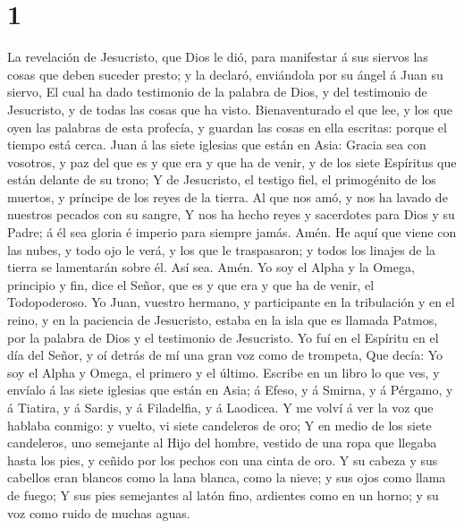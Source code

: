 \hypertarget{section}{%
\section{1}\label{section}}

 La revelación de Jesucristo, que Dios le dió, para
manifestar á sus siervos las cosas que deben suceder presto; y la
declaró, enviándola por su ángel á Juan su siervo,  El
cual ha dado testimonio de la palabra de Dios, y del testimonio de
Jesucristo, y de todas las cosas que ha visto. 
Bienaventurado el que lee, y los que oyen las palabras de esta profecía,
y guardan las cosas en ella escritas: porque el tiempo está cerca.
 Juan á las siete iglesias que están en Asia: Gracia sea
con vosotros, y paz del que es y que era y que ha de venir, y de los
siete Espíritus que están delante de su trono;  Y de
Jesucristo, el testigo fiel, el primogénito de los muertos, y príncipe
de los reyes de la tierra. Al que nos amó, y nos ha lavado de nuestros
pecados con su sangre,  Y nos ha hecho reyes y sacerdotes
para Dios y su Padre; á él sea gloria é imperio para siempre jamás.
Amén.  He aquí que viene con las nubes, y todo ojo le
verá, y los que le traspasaron; y todos los linajes de la tierra se
lamentarán sobre él. Así sea. Amén.  Yo soy el Alpha y la
Omega, principio y fin, dice el Señor, que es y que era y que ha de
venir, el Todopoderoso.  Yo Juan, vuestro hermano, y
participante en la tribulación y en el reino, y en la paciencia de
Jesucristo, estaba en la isla que es llamada Patmos, por la palabra de
Dios y el testimonio de Jesucristo.  Yo fuí en el
Espíritu en el día del Señor, y oí detrás de mí una gran voz como de
trompeta,  Que decía: Yo soy el Alpha y Omega, el primero
y el último. Escribe en un libro lo que ves, y envíalo á las siete
iglesias que están en Asia; á Efeso, y á Smirna, y á Pérgamo, y á
Tiatira, y á Sardis, y á Filadelfia, y á Laodicea.  Y me
volví á ver la voz que hablaba conmigo: y vuelto, vi siete candeleros de
oro;  Y en medio de los siete candeleros, uno semejante
al Hijo del hombre, vestido de una ropa que llegaba hasta los pies, y
ceñido por los pechos con una cinta de oro.  Y su cabeza
y sus cabellos eran blancos como la lana blanca, como la nieve; y sus
ojos como llama de fuego;  Y sus pies semejantes al latón
fino, ardientes como en un horno; y su voz como ruido de muchas aguas.
